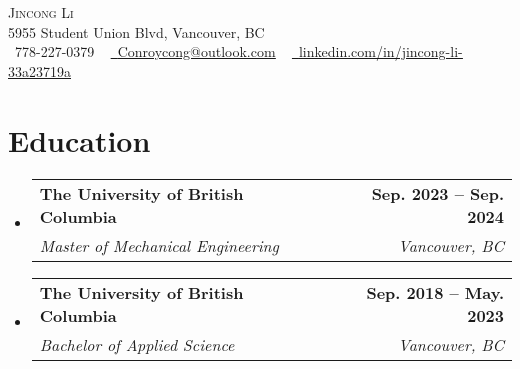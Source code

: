 \documentclass[letterpaper,11pt]{article}
\makeatletter
\newcommand{\resumeSubheading}[4]{
  \vspace{-2pt}\item
    \begin{tabular*}{1.0\textwidth}[t]{l@{\extracolsep{\fill}}r}
      \textbf{#1} & \textbf{\small #2} \\
      \textit{\small#3} & \textit{\small #4} \\
    \end{tabular*}\vspace{-7pt}
}
\newcommand{\resumeSubHeadingListStart}{\begin{itemize}[leftmargin=0.0in, label={}]}
\newcommand{\resumeSubHeadingListEnd}{\end{itemize}}
\makeatother
\begin{document}

\begin{center}
    {\Huge \scshape Jincong Li} \\ \vspace{1pt}
    5955 Student Union Blvd, Vancouver, BC \\ \vspace{1pt}
    \small \raisebox{-0.1\height}\faPhone\ 778-227-0379 ~ \href{mailto:x@gmail.com}{\raisebox{-0.2\height}\faEnvelope\  \underline{Conroycong@outlook.com}} ~ 
    \href{https://linkedin.com/in/jincong-li-33a23719a/}{\raisebox{-0.2\height}\faLinkedin\ \underline{linkedin.com/in/jincong-li-33a23719a}}  ~
    \vspace{-8pt}
\end{center}


\section{Education}
  \resumeSubHeadingListStart
    \resumeSubheading
      {The University of British Columbia}{Sep. 2023 -- Sep. 2024}
      {Master of Mechanical Engineering}{Vancouver, BC}
    \resumeSubheading
      {The University of British Columbia}{Sep. 2018 -- May. 2023}
      {Bachelor of Applied Science}{Vancouver, BC}
  \resumeSubHeadingListEnd

\end{document}

